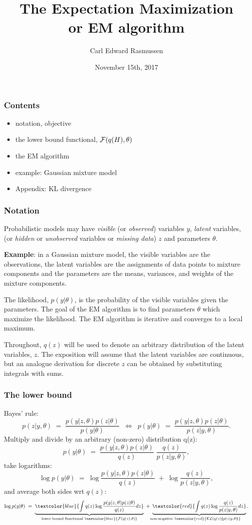 \documentclass[10pt]{beamer}
\title[The EM algorithm]{The Expectation Maximization\\ or EM algorithm}
\author{Carl Edward Rasmussen}
\date{November 15th, 2017}
\newcommand{\Red}{\textcolor{red}}
\newcommand{\Blue}{\textcolor{blue}}
\newcommand{\y}{y}
\newcommand{\z}{z}
\begin{document}
\begin{frame}
\titlepage

\end{frame}

\begin{frame}
\frametitle{Contents}

\begin{itemize}
\item notation, objective
\item the lower bound functional, ${\cal F}(q(H),\theta)$
\item the EM algorithm
\item example: Gaussian mixture model
\item Appendix: KL divergence
\end{itemize}
\end{frame}

\begin{frame}
\frametitle{Notation}

Probabilistic models may have \emph{visible} (or \emph{observed}) variables $\y$, \emph{latent} variables, (or \emph{hidden} or \emph{unobserved}  variables or \emph{missing data}) $\z$ and parameters $\theta$.

{\bf Example}: in a Gaussian mixture model, the visible variables are the observations, the latent variables are the assignments of data points to mixture components and the parameters are the means, variances, and weights of the mixture components.

The likelihood, $p(\y|\theta)$, is the probability of the visible variables given the parameters. The goal of the EM algorithm is to find parameters $\theta$ which maximize the likelihood. The EM algorithm is iterative and converges to a local maximum.

Throughout, $q(\z)$ will be used to denote an arbitrary distribution of the latent variables, $\z$. The exposition will assume that the latent variables are continuous, but an analogue derivation for discrete $\z$ can be obtained by substituting integrals with sums.
\end{frame}

\begin{frame}
\frametitle{The lower bound}

Bayes' rule:
\[
p(\z|\y,\theta)\;=\;\frac{p(\y|\z,\theta)p(\z|\theta)}{p(\y|\theta)}\;\;\Leftrightarrow\;\;
p(\y|\theta)\;=\;\frac{p(\y|\z,\theta)p(\z|\theta)}{p(\z|\y,\theta)}.
\]
Multiply and divide by an arbitrary (non-zero) distribution q(\z):
\[
p(\y|\theta)\;=\;\frac{p(\y|\z,\theta)p(\z|\theta)}{q(\z)}\;\frac{q(\z)}{p(\z|\y,\theta)},
\]
take logarithms:
\[
\log p(\y|\theta)\;=\;\log\frac{p(\y|\z,\theta)p(\z|\theta)}{q(\z)}\;+\;\log\frac{q(\z)}{p(\z|\y,\theta)},
\] 
and average both sides wrt $q(\z)$:
\[
\log p(\y|\theta)\;=\;\underbrace{\Blue{\int q(\z)\log\frac{p(\y|\z,\theta)p(\z|\theta)}{q(\z)}d\z}}_{\text{lower bound functional\ }\Blue{{\cal F}(q(\z),\theta)}}\;+\;
\underbrace{\Red{\int q(\z)\log\frac{q(\z)}{p(\z|\y,\theta)}d\z}}_{\!\!\!\!\!\!\!\!\!\!\!\text{non-negative\ }\Red{{\cal KL}(q(\z)|\!|p(\z|\y,\theta)\!)}}.
\]
\end{frame}
\end{document}
